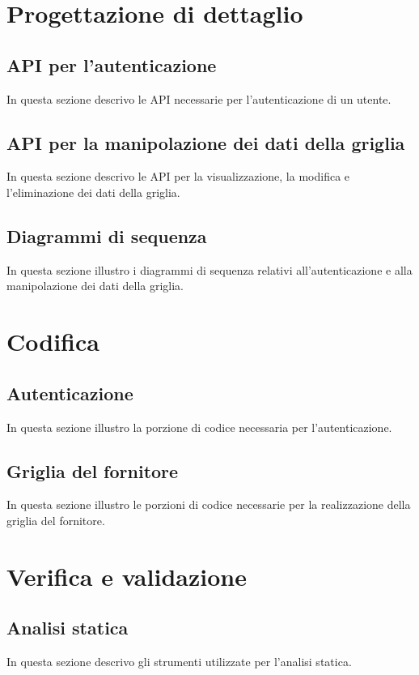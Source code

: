 \section{Progettazione di dettaglio}

\subsection{API per l'autenticazione}
In questa sezione descrivo le API necessarie per l'autenticazione di un utente.

\subsection{API per la manipolazione dei dati della griglia}
In questa sezione descrivo le API per la visualizzazione, la modifica e l'eliminazione dei dati della griglia.

\subsection{Diagrammi di sequenza}
In questa sezione illustro i diagrammi di sequenza relativi all'autenticazione e alla manipolazione dei dati della griglia.

\section{Codifica}

\subsection{Autenticazione}
In questa sezione illustro la porzione di codice necessaria per l'autenticazione.

\subsection{Griglia del fornitore}
In questa sezione illustro le porzioni di codice necessarie per la realizzazione della griglia del fornitore.

\section{Verifica e validazione}

\subsection{Analisi statica}
In questa sezione descrivo gli strumenti utilizzate per l'analisi statica.

